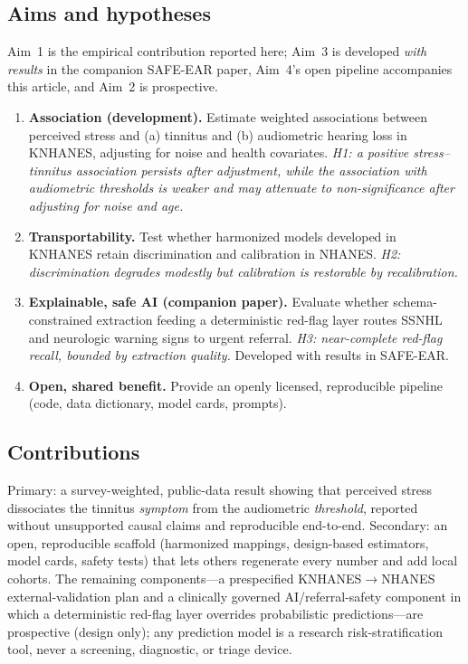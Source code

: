 \subsection{Aims and hypotheses}
Aim~1 is the empirical contribution reported here; Aim~3 is developed \emph{with
results} in the companion SAFE-EAR paper, Aim~4's open pipeline accompanies this
article, and Aim~2 is prospective.
\begin{enumerate}[leftmargin=1.5em,itemsep=2pt]
\item \textbf{Association (development).} Estimate weighted associations between
perceived stress and (a) tinnitus and (b) audiometric hearing loss in KNHANES,
adjusting for noise and health covariates. \emph{H1: a positive stress--tinnitus
association persists after adjustment, while the association with audiometric
thresholds is weaker and may attenuate to non-significance after adjusting for
noise and age.}
\item \textbf{Transportability.} Test whether harmonized models developed in
KNHANES retain discrimination and calibration in NHANES. \emph{H2: discrimination
degrades modestly but calibration is restorable by recalibration.}
\item \textbf{Explainable, safe AI (companion paper).} Evaluate whether
schema-constrained extraction feeding a deterministic red-flag layer routes SSNHL
and neurologic warning signs to urgent referral. \emph{H3: near-complete red-flag
recall, bounded by extraction quality.} Developed with results in SAFE-EAR.
\item \textbf{Open, shared benefit.} Provide an openly licensed, reproducible
pipeline (code, data dictionary, model cards, prompts).
\end{enumerate}

\subsection{Contributions}
Primary: a survey-weighted, public-data result showing that perceived stress
dissociates the tinnitus \emph{symptom} from the audiometric \emph{threshold},
reported without unsupported causal claims and reproducible end-to-end. Secondary:
an open, reproducible scaffold (harmonized mappings, design-based estimators,
model cards, safety tests) that lets others regenerate every number and add local
cohorts. The remaining components---a prespecified KNHANES$\rightarrow$NHANES
external-validation plan and a clinically governed AI/referral-safety component in
which a deterministic red-flag layer overrides probabilistic predictions---are
prospective (design only); any prediction model is a research risk-stratification
tool, never a screening, diagnostic, or triage device.
